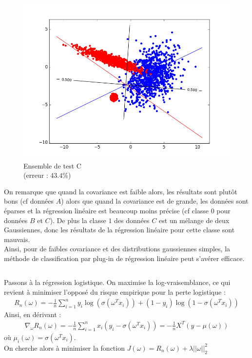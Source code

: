 \documentclass[paper=a4, fontsize=11pt]{article}
\begin{document}
\begin{figure}[h]
 \begin{minipage}[b]{.3\linewidth}
  \begin{center}
  \includegraphics[scale=0.25]{figures/lin_reg_C_test.png}
  \caption*{Ensemble de test C  \\ (erreur : $43.4\%$)}
   \end{center}
 \end{minipage}
\end{figure}
On remarque que quand la covariance est faible alors, les résultats sont plutôt bons (cf données $A$) alors que quand la covariance est de grande, les données sont éparses et la régression linéaire est beaucoup moins précise (cf classe $0$ pour données $B$ et $C$). De plus la classe $1$ des données $C$ est un mélange de deux Gaussiennes, donc les résultats de la régression linéaire pour cette classe sont mauvais. \\
Ainsi, pour de faibles covariance et des distributions gaussiennes simples, la méthode de classification par plug-in de régression linéaire peut s'avérer efficace. 
\subsection{}
Passons à la régression logistique. On maximise la log-vraisemblance, ce qui revient à minimiser l'opposé du risque empirique pour la perte logistique :
\begin{align*}
R_{n}(\omega) = -\frac{1}{n}\sum\limits_{i=1}^{n} y_i\log (\sigma(\omega^{T}x_i)) + (1-y_i)\log(1-\sigma(\omega^{T}x_i))
\end{align*}
Ainsi, en dérivant : 
\begin{align*}
\nabla_{\omega}R_{n}(\omega) = -\frac{1}{n}\sum\limits_{i=1}^{n} x_i(y_i - \sigma(\omega^{T}x_i)) = -\frac{1}{n}X^{T}(y-\mu(\omega)) 
\end{align*}
où $\mu_i(\omega) = \sigma(\omega^{T}x_i)$.\\
On cherche alors à minimiser la fonction $J(\omega) = R_{n}(\omega) + \lambda ||\omega ||^{2}_{2}$
\end{document}
